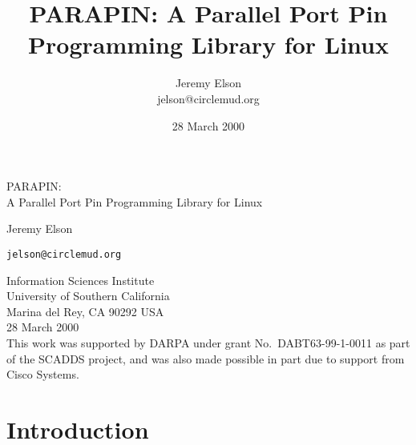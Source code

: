 \documentclass{article}
\title{PARAPIN:
A Parallel Port Pin Programming Library for Linux}
\author{Jeremy Elson\\
jelson@circlemud.org}
\date{28 March 2000}
\begin{document}

\begin{center}
\begin{latexonly}\vspace*{2in}\end{latexonly}
{\Huge PARAPIN:} \\
\vspace{2\baselineskip}
{\huge A Parallel Port Pin Programming Library for Linux}

\begin{latexonly}\vspace{2in}\end{latexonly}
\vspace{\baselineskip}

{\Large Jeremy Elson \\
\begin{latexonly}\vspace{.5\baselineskip}\end{latexonly}
{\tt jelson@circlemud.org}}

\vfill

Information Sciences Institute \\
University of Southern California \\
Marina del Rey, CA 90292   USA \\
\vspace{\baselineskip}
28 March 2000\\
\vspace{\baselineskip}
This work was supported by DARPA under grant No.\ DABT63-99-1-0011 as
part of the SCADDS project, and was also made possible in part due to
support from Cisco Systems.

\end{center}
\thispagestyle{empty}
\clearpage


\begin{latexonly}

\tableofcontents
\clearpage
\end{latexonly}


\section{Introduction}
\end{document}
